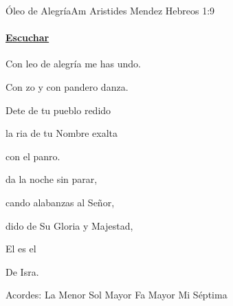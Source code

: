 \documentclass[12pt, spanish]{book}
\begin{document}
    \begin{song}{Óleo de Alegría}{Am}
    {} %
    {Aristides Mendez}
    {Hebreos 1:9} %
    {}
        \ifChordBk
        \paragraph{\mbox{}\hfill\protect\href{https://open.spotify.com/intl-es/track/1dh89sm1r18WIQGULi2oBs}{Escuchar}\mbox{}\hfill}
        \fi


        \begin{SBOpGroup}
            Con leo de alegría me has undo.

            Con zo y con pandero danza.

            Dete de tu pueblo redido

            la ria de tu Nombre exalta

            con el panro.
        \end{SBOpGroup}

        \begin{SBChorus}
            da la noche sin parar,

            cando alabanzas al Señor,

            dido de Su Gloria y Majestad,

            El es el 

            De Isra.
        \end{SBChorus}

        \ifChordBk
        \begin{SBOpGroup}
            Acordes:
            \upchord{\Am}\qquad La Menor \hfill
            \upchord{\G}\qquad Sol Mayor \hfill\null\break
            \upchord{\F}\qquad Fa Mayor \hfill
            \upchord{\Eseven}\qquad Mi S\'eptima \hfill\null\break
        \end{SBOpGroup}
        \fi
    \end{song}
\end{document}
